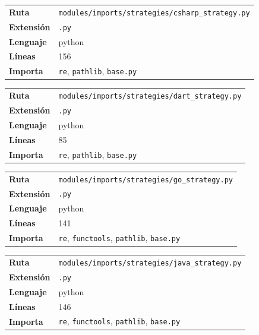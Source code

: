 \documentclass[12pt, a4paper]{report}
\begin{document}
\medskip

\begin{fichabox}
\small
\begin{tabular}{@{}ll@{}}
  \textbf{Ruta} & \texttt{modules/imports/strategies/csharp\_strategy.py} \\
  \textbf{Extensión} & \texttt{.py} \\
  \textbf{Lenguaje} & python \\
  \textbf{Líneas} & 156 \\
  \textbf{Importa} & \parbox[t]{10cm}{\texttt{re}, \texttt{pathlib}, \texttt{base.py}} \\
\end{tabular}
\end{fichabox}

\medskip

\begin{fichabox}
\small
\begin{tabular}{@{}ll@{}}
  \textbf{Ruta} & \texttt{modules/imports/strategies/dart\_strategy.py} \\
  \textbf{Extensión} & \texttt{.py} \\
  \textbf{Lenguaje} & python \\
  \textbf{Líneas} & 85 \\
  \textbf{Importa} & \parbox[t]{10cm}{\texttt{re}, \texttt{pathlib}, \texttt{base.py}} \\
\end{tabular}
\end{fichabox}

\medskip

\begin{fichabox}
\small
\begin{tabular}{@{}ll@{}}
  \textbf{Ruta} & \texttt{modules/imports/strategies/go\_strategy.py} \\
  \textbf{Extensión} & \texttt{.py} \\
  \textbf{Lenguaje} & python \\
  \textbf{Líneas} & 141 \\
  \textbf{Importa} & \parbox[t]{10cm}{\texttt{re}, \texttt{functools}, \texttt{pathlib}, \texttt{base.py}} \\
\end{tabular}
\end{fichabox}

\medskip

\begin{fichabox}
\small
\begin{tabular}{@{}ll@{}}
  \textbf{Ruta} & \texttt{modules/imports/strategies/java\_strategy.py} \\
  \textbf{Extensión} & \texttt{.py} \\
  \textbf{Lenguaje} & python \\
  \textbf{Líneas} & 146 \\
  \textbf{Importa} & \parbox[t]{10cm}{\texttt{re}, \texttt{functools}, \texttt{pathlib}, \texttt{base.py}} \\
\end{tabular}
\end{fichabox}
\end{document}
